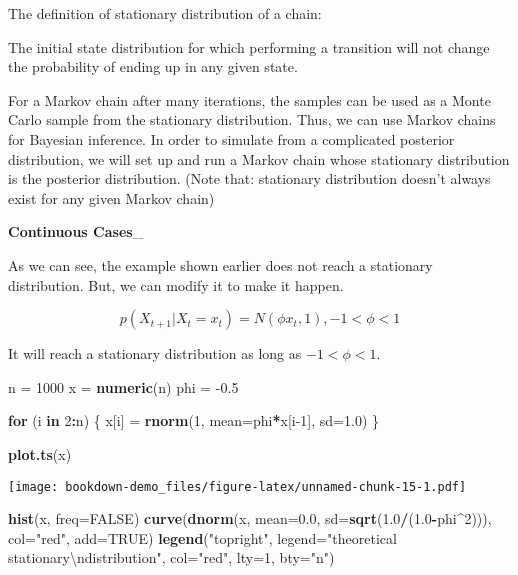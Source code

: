\documentclass[]{book}
\newenvironment{Shaded}{\begin{snugshade}}{\end{snugshade}}
\newcommand{\CharTok}[1]{\textcolor[rgb]{0.31,0.60,0.02}{#1}}
\newcommand{\ControlFlowTok}[1]{\textcolor[rgb]{0.13,0.29,0.53}{\textbf{#1}}}
\newcommand{\DataTypeTok}[1]{\textcolor[rgb]{0.13,0.29,0.53}{#1}}
\newcommand{\DecValTok}[1]{\textcolor[rgb]{0.00,0.00,0.81}{#1}}
\newcommand{\FloatTok}[1]{\textcolor[rgb]{0.00,0.00,0.81}{#1}}
\newcommand{\KeywordTok}[1]{\textcolor[rgb]{0.13,0.29,0.53}{\textbf{#1}}}
\newcommand{\NormalTok}[1]{#1}
\newcommand{\OperatorTok}[1]{\textcolor[rgb]{0.81,0.36,0.00}{\textbf{#1}}}
\newcommand{\OtherTok}[1]{\textcolor[rgb]{0.56,0.35,0.01}{#1}}
\newcommand{\StringTok}[1]{\textcolor[rgb]{0.31,0.60,0.02}{#1}}
\begin{document}
The definition of stationary distribution of a chain:

The initial state distribution for which performing a transition will not change the probability of ending up in any given state.

For a Markov chain after many iterations, the samples can be used as a Monte Carlo sample from the stationary distribution. Thus, we can use Markov chains for Bayesian inference. In order to simulate from a complicated posterior distribution, we will set up and run a Markov chain whose stationary distribution is the posterior distribution. (Note that: stationary distribution doesn't always exist for any given Markov chain)

\textbf{Continuous Cases}\_

As we can see, the example shown earlier does not reach a stationary distribution. But, we can modify it to make it happen.

\[p(X_{t+1}|X_t=x_t)=N(\phi x_t,1), -1<\phi<1\]

It will reach a stationary distribution as long as \(-1<\phi<1\).

\begin{Shaded}
\begin{Highlighting}[]
\NormalTok{n =}\StringTok{ }\DecValTok{1000}
\NormalTok{x =}\StringTok{ }\KeywordTok{numeric}\NormalTok{(n)}
\NormalTok{phi =}\StringTok{ }\FloatTok{-0.5}

\ControlFlowTok{for}\NormalTok{ (i }\ControlFlowTok{in} \DecValTok{2}\OperatorTok{:}\NormalTok{n) \{}
\NormalTok{  x[i] =}\StringTok{ }\KeywordTok{rnorm}\NormalTok{(}\DecValTok{1}\NormalTok{, }\DataTypeTok{mean=}\NormalTok{phi}\OperatorTok{*}\NormalTok{x[i}\DecValTok{-1}\NormalTok{], }\DataTypeTok{sd=}\FloatTok{1.0}\NormalTok{)}
\NormalTok{\}}

\KeywordTok{plot.ts}\NormalTok{(x)}
\end{Highlighting}
\end{Shaded}

\texttt{[image: bookdown-demo\_files/figure-latex/unnamed-chunk-15-1.pdf]}

\begin{Shaded}
\begin{Highlighting}[]
\KeywordTok{hist}\NormalTok{(x, }\DataTypeTok{freq=}\OtherTok{FALSE}\NormalTok{)}
\KeywordTok{curve}\NormalTok{(}\KeywordTok{dnorm}\NormalTok{(x, }\DataTypeTok{mean=}\FloatTok{0.0}\NormalTok{, }\DataTypeTok{sd=}\KeywordTok{sqrt}\NormalTok{(}\FloatTok{1.0}\OperatorTok{/}\NormalTok{(}\FloatTok{1.0}\OperatorTok{-}\NormalTok{phi}\OperatorTok{^}\DecValTok{2}\NormalTok{))), }\DataTypeTok{col=}\StringTok{"red"}\NormalTok{, }\DataTypeTok{add=}\OtherTok{TRUE}\NormalTok{)}
\KeywordTok{legend}\NormalTok{(}\StringTok{"topright"}\NormalTok{, }\DataTypeTok{legend=}\StringTok{"theoretical stationary}\CharTok{\textbackslash{}n}\StringTok{distribution"}\NormalTok{, }\DataTypeTok{col=}\StringTok{"red"}\NormalTok{, }\DataTypeTok{lty=}\DecValTok{1}\NormalTok{, }\DataTypeTok{bty=}\StringTok{"n"}\NormalTok{)}
\end{Highlighting}
\end{Shaded}
\end{document}
